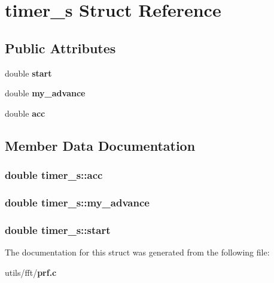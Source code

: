 \section{timer\_\-s Struct Reference}
\label{structtimer__s}
\subsection*{Public Attributes}
\begin{CompactItemize}
\item 
double {\bf start}
\item 
double {\bf my\_\-advance}
\item 
double {\bf acc}
\end{CompactItemize}


\subsection{Member Data Documentation}
\subsubsection{\setlength{\rightskip}{0pt plus 5cm}double {\bf timer\_\-s::acc}}\label{structtimer__s_bff68ab4706fdfedf7f8b5dbcebf7478}


\subsubsection{\setlength{\rightskip}{0pt plus 5cm}double {\bf timer\_\-s::my\_\-advance}}\label{structtimer__s_72488267ffd0afb8e290d07cb845c97d}


\subsubsection{\setlength{\rightskip}{0pt plus 5cm}double {\bf timer\_\-s::start}}\label{structtimer__s_bb739b1cd95fc12ed1fb42d29079bc59}




The documentation for this struct was generated from the following file:\begin{CompactItemize}
\item 
utils/fft/{\bf prf.c}\end{CompactItemize}
